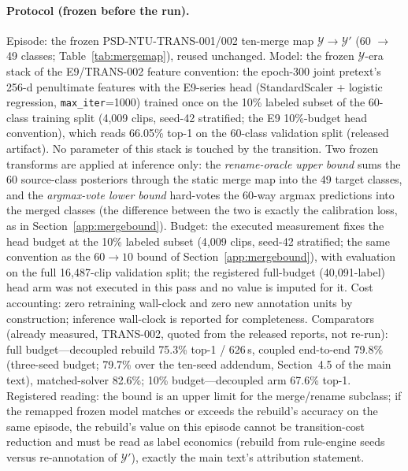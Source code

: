 \documentclass[11pt,a4paper]{article}
\begin{document}
\paragraph{Protocol (frozen before the run).}
Episode: the frozen PSD-NTU-TRANS-001/002 ten-merge map $\mathcal{Y}\to\mathcal{Y}'$ (60 $\to$ 49 classes; Table~\ref{tab:mergemap}), reused unchanged. Model: the frozen $\mathcal{Y}$-era stack of the E9/TRANS-002 feature convention: the epoch-300 joint pretext's 256-d penultimate features with the E9-series head (StandardScaler + logistic regression, \texttt{max\_iter}=1000) trained once on the 10\% labeled subset of the 60-class training split (4{,}009 clips, seed-42 stratified; the E9 10\%-budget head convention), which reads 66.05\% top-1 on the 60-class validation split (released artifact). No parameter of this stack is touched by the transition. Two frozen transforms are applied at inference only: the \emph{rename-oracle upper bound} sums the 60 source-class posteriors through the static merge map into the 49 target classes, and the \emph{argmax-vote lower bound} hard-votes the 60-way argmax predictions into the merged classes (the difference between the two is exactly the calibration loss, as in Section~\ref{app:mergebound}). Budget: the executed measurement fixes the head budget at the 10\% labeled subset (4{,}009 clips, seed-42 stratified; the same convention as the $60\to10$ bound of Section~\ref{app:mergebound}), with evaluation on the full 16{,}487-clip validation split; the registered full-budget (40{,}091-label) head arm was not executed in this pass and no value is imputed for it. Cost accounting: zero retraining wall-clock and zero new annotation units by construction; inference wall-clock is reported for completeness. Comparators (already measured, TRANS-002, quoted from the released reports, not re-run): full budget---decoupled rebuild 75.3\% top-1 / 626\,s, coupled end-to-end 79.8\% (three-seed budget; 79.7\% over the ten-seed addendum, Section~4.5 of the main text), matched-solver 82.6\%; 10\% budget---decoupled arm 67.6\% top-1. Registered reading: the bound is an upper limit for the merge/rename subclass; if the remapped frozen model matches or exceeds the rebuild's accuracy on the same episode, the rebuild's value on this episode cannot be transition-cost reduction and must be read as label economics (rebuild from rule-engine seeds versus re-annotation of $\mathcal{Y}'$), exactly the main text's attribution statement.
\end{document}
